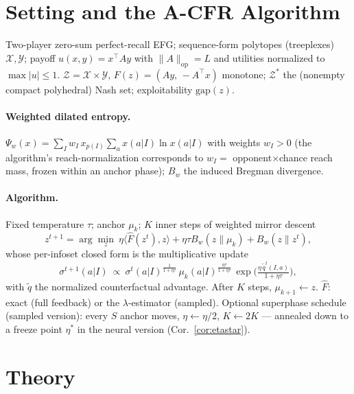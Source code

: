 \documentclass{article}
\newcommand{\X}{\mathcal{X}}
\newcommand{\Y}{\mathcal{Y}}
\newcommand{\Z}{\mathcal{Z}}
\newcommand{\Zs}{\mathcal{Z}^*}
\newcommand{\gap}{\mathrm{gap}}
\newcommand{\Bw}{B_w}
\newcommand{\Psiw}{\Psi_w}
\begin{document}
\section{Setting and the A-CFR Algorithm}
\label{sec:setting}
Two-player zero-sum perfect-recall EFG; sequence-form polytopes
(treeplexes) $\X,\Y$; payoff $u(x,y)=x^\top A y$ with
$\|A\|_{\mathrm{op}}=L$ and utilities normalized to $\max|u|\le 1$.
$\Z=\X\times\Y$, $F(z)=(Ay,\,-A^\top x)$ monotone;
$\Zs$ the (nonempty compact polyhedral) Nash set; exploitability
$\gap(z)$.

\paragraph{Weighted dilated entropy.}
$\Psiw(x)=\sum_I w_I\, x_{p(I)} \sum_a x(a|I)\ln x(a|I)$ with weights
$w_I>0$ (the algorithm's reach-normalization corresponds to
$w_I=$ opponent$\times$chance reach mass, frozen within an anchor
phase); $\Bw$ the induced Bregman divergence.

\paragraph{Algorithm.}
Fixed temperature $\tau$; anchor $\mu_k$; $K$ inner steps of weighted
mirror descent
\begin{equation}
  z^{t+1}=\arg\min_z\ \eta\langle \hat F(z^t),z\rangle
  +\eta\tau \Bw(z\|\mu_k)+\Bw(z\|z^t),
  \label{eq:update}
\end{equation}
whose per-infoset closed form is the multiplicative update
\[
  \sigma^{t+1}(a|I)\ \propto\
  \sigma^t(a|I)^{\frac{1}{1+\eta\tau}}\,
  \mu_k(a|I)^{\frac{\eta\tau}{1+\eta\tau}}\,
  \exp\Big(\tfrac{\eta\,\tilde q^t(I,a)}{1+\eta\tau}\Big),
\]
with $\tilde q$ the normalized counterfactual advantage.  After $K$
steps, $\mu_{k+1}\leftarrow z$.  $\hat F$: exact (full feedback) or the
$\lambda$-estimator (sampled).  Optional superphase schedule (sampled
version): every $S$ anchor moves, $\eta\leftarrow\eta/2$,
$K\leftarrow 2K$ --- annealed down to a freeze point $\eta^*$ in the
neural version (Cor.~\ref{cor:etastar}).

\section{Theory}
\label{sec:theory}
\end{document}
